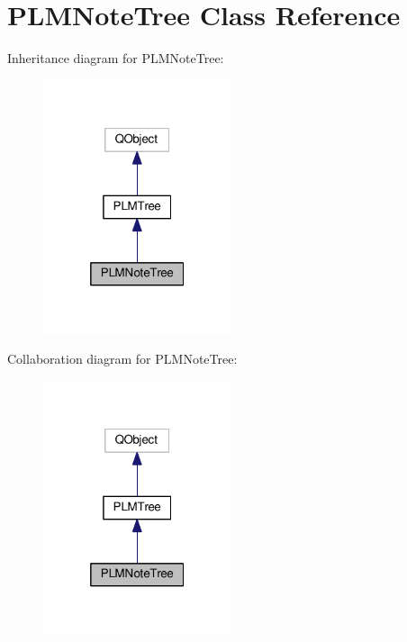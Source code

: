 \hypertarget{class_p_l_m_note_tree}{}\section{P\+L\+M\+Note\+Tree Class Reference}
\label{class_p_l_m_note_tree}


Inheritance diagram for P\+L\+M\+Note\+Tree\+:\nopagebreak
\begin{figure}[H]
\begin{center}
\leavevmode
\includegraphics[width=157pt]{class_p_l_m_note_tree__inherit__graph}
\end{center}
\end{figure}


Collaboration diagram for P\+L\+M\+Note\+Tree\+:\nopagebreak
\begin{figure}[H]
\begin{center}
\leavevmode
\includegraphics[width=157pt]{class_p_l_m_note_tree__coll__graph}
\end{center}
\end{figure}
